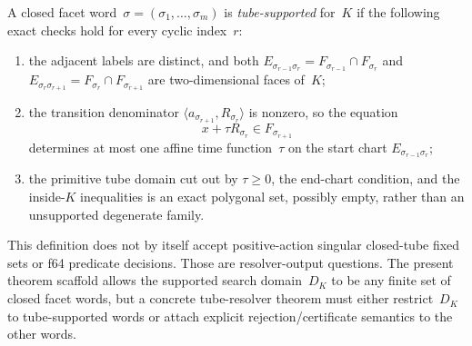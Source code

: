 \begin{unverified}
\begin{definition}%
\label{def:flow-graph-supported-closed-word}
A closed facet word~$\sigma=(\sigma_1,\ldots,\sigma_m)$ is
\emph{tube-supported} for~$K$ if the following exact checks hold for every
cyclic index~$r$:
\begin{enumerate}
  \item the adjacent labels are distinct, and both
    $E_{\sigma_{r-1}\sigma_r}
      =F_{\sigma_{r-1}}\cap F_{\sigma_r}$
    and
    $E_{\sigma_r\sigma_{r+1}}
      =F_{\sigma_r}\cap F_{\sigma_{r+1}}$
    are two-dimensional faces of~$K$;
  \item the transition denominator
    $\langle a_{\sigma_{r+1}},R_{\sigma_r}\rangle$ is nonzero, so the equation
    \[
      x+\tau R_{\sigma_r}\in F_{\sigma_{r+1}}
    \]
    determines at most one affine time function~$\tau$ on the start chart
    $E_{\sigma_{r-1}\sigma_r}$;
  \item the primitive tube domain cut out by $\tau\geq0$, the end-chart
    condition, and the inside-$K$ inequalities is an exact polygonal set,
    possibly empty, rather than an unsupported degenerate family.
\end{enumerate}
This definition does not by itself accept positive-action singular closed-tube
fixed sets or f64 predicate decisions.  Those are resolver-output questions.
The present theorem scaffold allows the supported search domain~$D_K$ to be
any finite set of closed facet words, but a concrete tube-resolver theorem must
either restrict~$D_K$ to tube-supported words or attach explicit
rejection/certificate semantics to the other words.
\end{definition}
\end{unverified}

